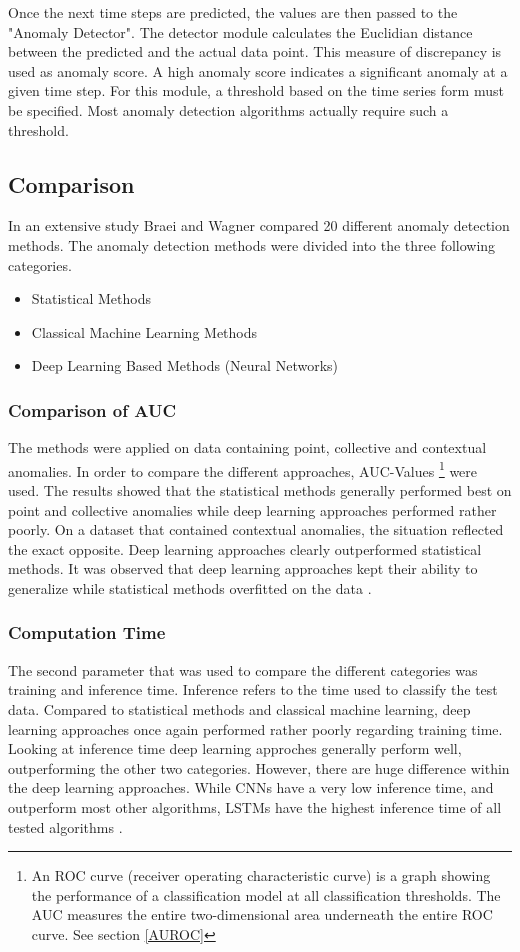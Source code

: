 Once the next time steps are predicted, the values are then passed to the "Anomaly Detector". The detector module calculates the Euclidian distance between the predicted and the actual data point. This measure of discrepancy is used as anomaly score. A high anomaly score indicates a significant anomaly at a given time step. For this module, a threshold based on the time series form must be specified. Most anomaly detection algorithms actually require such a threshold.


\subsection{Comparison}
In an extensive study Braei and Wagner \parencite*{Braei2020} compared 20 different anomaly detection methods. The anomaly detection methods were divided into the three following  categories. 

\begin{itemize}
	\item Statistical Methods
	\item Classical Machine Learning Methods
	\item Deep Learning Based Methods (Neural Networks)
\end{itemize}


\subsubsection{Comparison of AUC}
The methods were applied on data containing point, collective and contextual anomalies. In order to compare the different approaches, AUC-Values \footnote{An ROC curve (receiver operating characteristic curve) is a graph showing the performance of a classification model at all classification thresholds. The AUC measures the entire two-dimensional area underneath the entire ROC curve. See section \ref{AUROC}} were used. The results showed that the statistical methods generally performed best on point and collective anomalies while deep learning approaches performed rather poorly. On a dataset that contained contextual anomalies, the situation reflected the exact opposite. Deep learning approaches clearly outperformed statistical methods. It was observed that deep learning approaches kept their ability to generalize while statistical methods overfitted on the data \parencite{Braei2020}.

\subsubsection{Computation Time}
The second parameter that was used to compare the different categories was training and inference time. Inference refers to the time used to classify the test data. Compared to statistical methods and classical machine learning, deep learning approaches once again performed rather poorly regarding training time. Looking at inference time deep learning approches generally perform well, outperforming the other two categories. However, there are huge difference within the deep learning approaches. While CNNs have a very low inference time, and outperform most other algorithms, LSTMs have the highest inference time of all tested algorithms \parencite{Braei2020}.  


